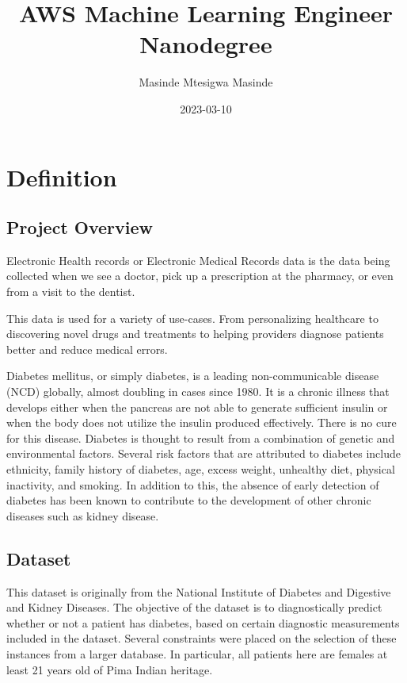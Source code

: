 \documentclass[
]{article}
\title{AWS Machine Learning Engineer Nanodegree}
\author{Masinde Mtesigwa Masinde}
\date{2023-03-10}
\begin{document}
\maketitle

{
\setcounter{tocdepth}{3}
\tableofcontents
}
\newpage

\hypertarget{definition}{%
\section{Definition}\label{definition}}

\hypertarget{project-overview}{%
\subsection{Project Overview}\label{project-overview}}

Electronic Health records or Electronic Medical Records data is the data
being collected when we see a doctor, pick up a prescription at the
pharmacy, or even from a visit to the dentist.

This data is used for a variety of use-cases. From personalizing
healthcare to discovering novel drugs and treatments to helping
providers diagnose patients better and reduce medical errors.

Diabetes mellitus, or simply diabetes, is a leading non-communicable
disease (NCD) globally, almost doubling in cases since 1980. It is a
chronic illness that develops either when the pancreas are not able to
generate sufficient insulin or when the body does not utilize the
insulin produced effectively. There is no cure for this disease.
Diabetes is thought to result from a combination of genetic and
environmental factors. Several risk factors that are attributed to
diabetes include ethnicity, family history of diabetes, age, excess
weight, unhealthy diet, physical inactivity, and smoking. In addition to
this, the absence of early detection of diabetes has been known to
contribute to the development of other chronic diseases such as kidney
disease.

\hypertarget{dataset}{%
\subsection{Dataset}\label{dataset}}

This dataset is originally from the National Institute of Diabetes and
Digestive and Kidney Diseases. The objective of the dataset is to
diagnostically predict whether or not a patient has diabetes, based on
certain diagnostic measurements included in the dataset. Several
constraints were placed on the selection of these instances from a
larger database. In particular, all patients here are females at least
21 years old of Pima Indian heritage.
\end{document}
